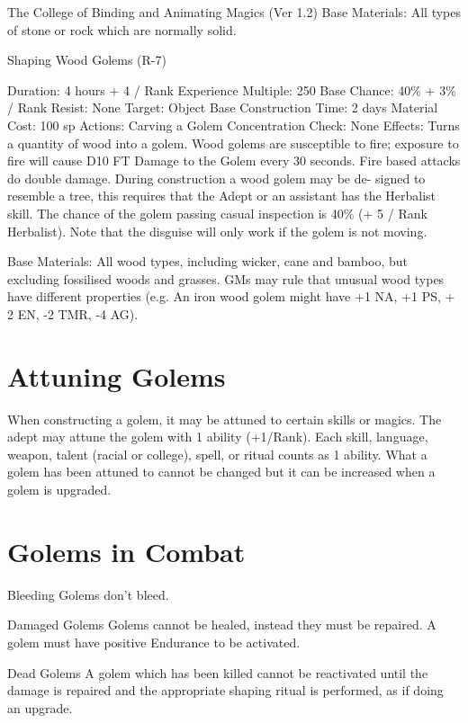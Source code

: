 \begin{Chapter}{The College of Binding and Animating Magics (Ver 1.2)}
Base  Materials:  All  types  of  stone  or  rock  which 
are normally solid. 

Shaping Wood Golems (R-7) 

Duration: 4 hours + 4 / Rank 
Experience Multiple: 250 
Base Chance: 40\% + 3\% / Rank 
Resist: None 
Target: Object 
Base Construction Time: 2 days 
Material Cost: 100 sp 
Actions: Carving a Golem 
Concentration Check: None 
Effects:  Turns  a  quantity  of  wood  into  a  golem. 
Wood  golems  are  susceptible  to  fire;  exposure  to 
fire will cause D10 FT Damage to the Golem every 
30  seconds.  Fire  based  attacks  do  double  damage. 
During  construction  a  wood  golem  may  be  de-
signed  to  resemble  a  tree,  this  requires  that  the 
Adept  or  an  assistant  has  the  Herbalist  skill.  The 
chance  of  the  golem  passing  casual  inspection  is 
40\% (+ 5 / Rank Herbalist). Note that the disguise 
will only work if the golem is not moving. 

Base  Materials:  All  wood  types,  including  wicker, 
cane  and  bamboo,  but  excluding  fossilised  woods 
and  grasses.  GMs  may  rule  that  unusual  wood 
types  have  different  properties  (e.g. An  iron  wood 
golem might have +1 NA, +1 PS, + 2 EN, -2 TMR, 
-4 AG). 


\section{Attuning Golems}

When constructing a golem, it may be attuned to certain skills or
magics.  The adept may attune the golem with 1 ability (+1/Rank).
Each skill, language, weapon, talent (racial or college), spell, or
ritual counts as 1 ability.  What a golem has been attuned to cannot
be changed but it can be increased when a golem is upgraded.


\section{Golems in Combat}

Bleeding Golems don’t bleed. 

Damaged  Golems  Golems  cannot  be  healed,  instead  they  must  be  repaired.  A  golem  must  have 
positive Endurance to be activated. 

Dead  Golems  A  golem  which  has  been  killed 
cannot  be  reactivated  until  the  damage  is  repaired 
and the appropriate shaping ritual is performed, as 
if doing an upgrade. 


\end{Chapter}
